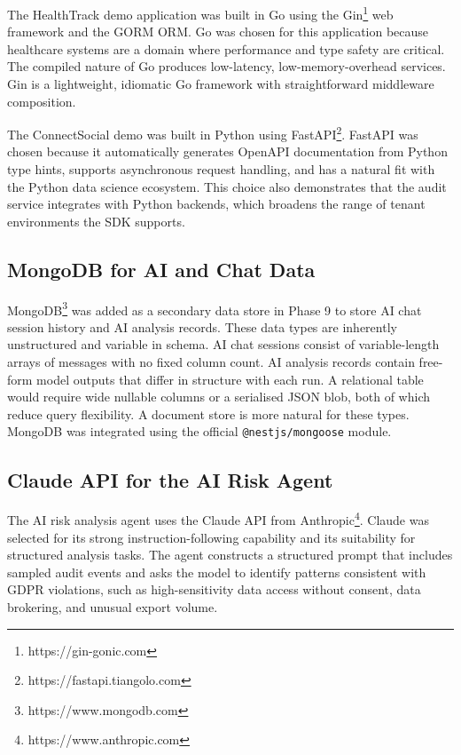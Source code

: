 \documentclass[a4paper,12pt,onecolumn]{report}
\begin{document}
The HealthTrack demo application was built in Go using the Gin\footnote{\label{gin}https://gin-gonic.com} web framework and the GORM ORM.
Go was chosen for this application because healthcare systems are a domain where performance and type safety are critical.
The compiled nature of Go produces low-latency, low-memory-overhead services.
Gin is a lightweight, idiomatic Go framework with straightforward middleware composition.

The ConnectSocial demo was built in Python using FastAPI\footnote{\label{fastapi}https://fastapi.tiangolo.com}.
FastAPI was chosen because it automatically generates OpenAPI documentation from Python type hints, supports asynchronous request handling, and has a natural fit with the Python data science ecosystem.
This choice also demonstrates that the audit service integrates with Python backends, which broadens the range of tenant environments the SDK supports.

\subsection{MongoDB for AI and Chat Data}

MongoDB\footnote{\label{mongodb}https://www.mongodb.com} was added as a secondary data store in Phase 9 to store AI chat session history and AI analysis records.
These data types are inherently unstructured and variable in schema.
AI chat sessions consist of variable-length arrays of messages with no fixed column count.
AI analysis records contain free-form model outputs that differ in structure with each run.
A relational table would require wide nullable columns or a serialised JSON blob, both of which reduce query flexibility.
A document store is more natural for these types.
MongoDB was integrated using the official \texttt{@nestjs/mongoose} module.

\subsection{Claude API for the AI Risk Agent}

The AI risk analysis agent uses the Claude API from Anthropic\footnote{\label{anthropic}https://www.anthropic.com}.
Claude was selected for its strong instruction-following capability and its suitability for structured analysis tasks.
The agent constructs a structured prompt that includes sampled audit events and asks the model to identify patterns consistent with GDPR violations, such as high-sensitivity data access without consent, data brokering, and unusual export volume.
\end{document}
